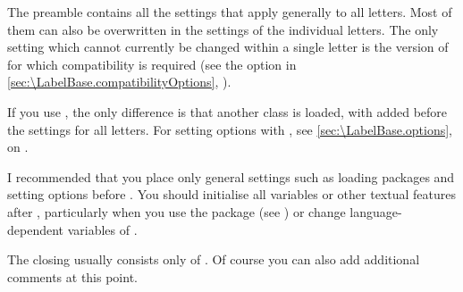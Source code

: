 The preamble contains all the settings that apply generally to all letters.
Most of them can also be overwritten in the settings of the individual
letters. The only setting which cannot currently be changed within a single
letter is the version of  for which compatibility is required
(see the  option in
\autoref{sec:\LabelBase.compatibilityOptions},
).

If you use , the only difference is
that another class is loaded, with
 added before the
settings for all letters. For setting options with , see
\autoref{sec:\LabelBase.options}, on .

I recommended that you place only general settings such as loading packages
and setting options before . You should
initialise all variables or other textual features after
, particularly when you use the
 package (see \cite{package:babel}) or
change language-dependent variables of .

The closing usually consists only of . Of
course you can also add additional comments at this point.


